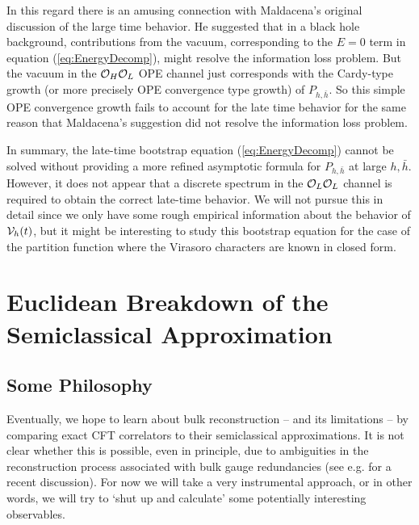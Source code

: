 \documentclass[12pt]{article}
\numberwithin{equation}{section}
\newcommand{\CO}{{\cal O}}
\newcommand{\CV}{{\cal V}}
\begin{document}
In this regard there is an amusing connection with Maldacena's original discussion \cite{Maldacena:2001kr} of the large time behavior.  He suggested that in a black hole background, contributions from the vacuum, corresponding to the $E=0$ term in equation (\ref{eq:EnergyDecomp}), might resolve the information loss problem.  But the vacuum in the $\CO_H \CO_L$ OPE channel just corresponds with the Cardy-type growth (or more precisely OPE convergence \cite{Pappadopulo:2012jk} type growth) of $P_{h, \bar h}$.  So this simple OPE convergence growth fails to account for the late time behavior for the same reason that Maldacena's suggestion did not resolve the information loss problem.
 
In summary, the late-time bootstrap equation (\ref{eq:EnergyDecomp}) cannot be solved without providing a more refined asymptotic formula for $P_{h, \bar h}$ at large $h, \bar h$.  However, it does not appear that a discrete spectrum in the $\CO_L \CO_L$ channel is required to obtain the correct late-time behavior.  We will not pursue this in detail since we only have some rough empirical information about the behavior of $\CV_h(t)$, but it might be interesting to study this bootstrap equation for the case of the partition function \cite{Dyer:2016pou} where the Virasoro characters are known in closed form.


\section{Euclidean Breakdown of the Semiclassical Approximation}
\label{sec:ForbiddenSingularitiesandReconstruction}

\subsection{Some Philosophy}


Eventually, we hope to learn about bulk reconstruction -- and its limitations -- by comparing exact CFT correlators to their semiclassical approximations.  It is not clear whether this is possible, even in principle, due to ambiguities in the reconstruction process associated with bulk gauge redundancies (see e.g. \cite{Jafferis:2017tiu} for a recent discussion).  For now we will take a very instrumental approach, or in other words, we will try to `shut up and calculate' some potentially interesting observables.  
\end{document}
